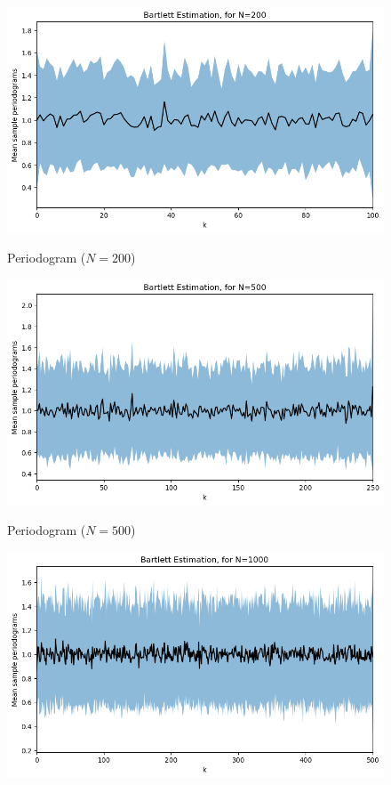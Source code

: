 \documentclass[11pt]{article}
\begin{document}
\begin{solution}
    
\begin{figure}
    \centering
    \begin{minipage}[t]{0.3\textwidth}
    \centerline{\includegraphics[width=\textwidth]{Barlett200}}
    \centerline{Periodogram ($N=200$)}
    \end{minipage}
    \begin{minipage}[t]{0.3\textwidth}
    \centerline{\includegraphics[width=\textwidth]{Barlett500}}
    \centerline{Periodogram ($N=500$)}
    \end{minipage}
    \begin{minipage}[t]{0.3\textwidth}
    \centerline{\includegraphics[width=\textwidth]{Barlett1000}}

\end{minipage}
\end{figure}
\end{solution}
\end{document}
